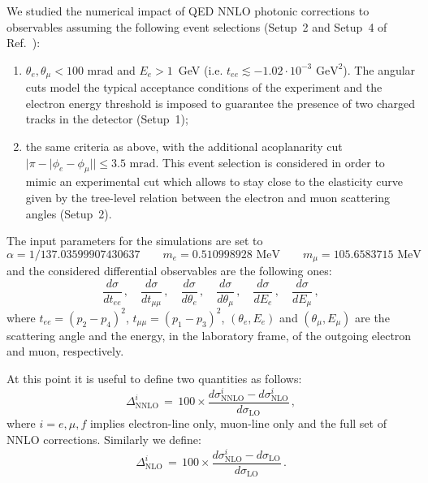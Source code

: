 \documentclass[Physsubmission, Phys]{SciPost}
\begin{document}
We studied the numerical impact of QED NNLO photonic corrections to observables
assuming the following event selections
(Setup~2 and Setup~4 of Ref.~\cite{Alacevich:2018vez}): 
\begin{enumerate}
\item  $\theta_e,\theta_\mu<100\text{\ mrad}$ and $E_e > 1$~GeV
  {(i.e. $t_{ee}\lesssim -1.02\cdot 10^{-3}\text{ GeV}^2$)}. The angular cuts model the typical acceptance 
conditions of the experiment and the electron energy threshold is imposed to
guarantee the presence of two charged tracks in the detector (Setup~1);
\item the same criteria as above, with the additional acoplanarity cut 
  $|\pi - |\phi_e-\phi_\mu||\le 3.5\text{\ mrad}$. This event selection is considered in order to mimic an experimental
  cut which allows to stay close to the elasticity curve given by the
  tree-level relation between the electron and muon scattering angles
  (Setup~2). 
\end{enumerate}  

The input parameters for the simulations are set to
\begin{equation}
  \alpha = 1/137.03599907430637 \qquad 
  m_e = 0.510998928\text{ MeV} \qquad m_\mu = 105.6583715\text{ MeV}\nonumber
  \label{eq:inputqedparams}
\end{equation}
and the considered differential observables are the following ones:
\begin{equation}
  \frac{d\sigma}{d t_{ee}}\,, \, \, \, \, \, \, 
  \frac{d\sigma}{d t_{\mu \mu}}\,, \, \, \, \, \, \,
  \frac{d\sigma}{d\theta_e}\,, \, \, \, \, \, \,
  \frac{d\sigma}{d\theta_\mu}\,, \, \, \, \, \, \,
  \frac{d\sigma}{d E_e}\,, \, \, \, \, \, \,
  \frac{d\sigma}{d E_\mu} \,,
  \label{eq:observables}
  \end{equation}
where $t_{ee} = (p_2 - p_4)^2$, $t_{\mu \mu} = (p_1 - p_3)^2$,
$(\theta_e, E_e)$ and $(\theta_\mu, E_\mu)$ are the scattering angle 
and the energy, in the laboratory frame, of the outgoing electron and muon,
respectively.


At this point it is useful to define two quantities as follows:
\begin{equation}
  \Delta_\text{NNLO}^i \, = \,
  100 \times \frac{d\sigma_\text{NNLO}^i - d\sigma_\text{NLO}^i}{d\sigma_\text{LO}}\, , 
  \label{eq:delta-def}
\end{equation}
where $i = e, \mu, f$ implies electron-line only, muon-line only
and the full set of NNLO corrections.
Similarly we define:
\begin{equation}
  \Delta_\text{NLO}^i \, = \,
  100 \times \frac{d\sigma_\text{NLO}^i - d\sigma_\text{LO}}{d\sigma_\text{LO}}\, .
  \label{eq:delta_NLO-def}
\end{equation} 
\end{document}
